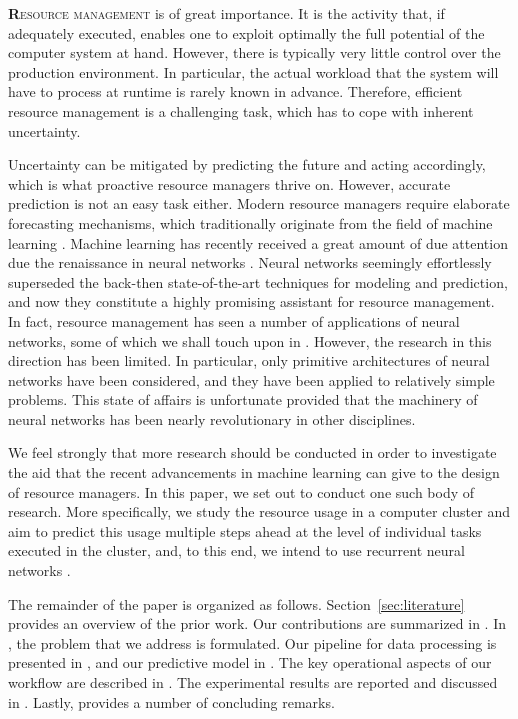 \lettrine[findent=0.2em, nindent=0em]{\textbf{R}}{esource management} is of
great importance. It is the activity that, if adequately executed, enables one
to exploit optimally the full potential of the computer system at hand. However,
there is typically very little control over the production environment. In
particular, the actual workload that the system will have to process at runtime
is rarely known in advance. Therefore, efficient resource management is a
challenging task, which has to cope with inherent uncertainty.

Uncertainty can be mitigated by predicting the future and acting accordingly,
which is what proactive resource managers thrive on. However, accurate
prediction is not an easy task either. Modern resource managers require
elaborate forecasting mechanisms, which traditionally originate from the field
of machine learning \cite{hastie2009}. Machine learning has recently received a
great amount of due attention due the renaissance in neural networks
\cite{goodfellow2016}. Neural networks seemingly effortlessly superseded the
back-then state-of-the-art techniques for modeling and prediction, and now they
constitute a highly promising assistant for resource management. In fact,
resource management has seen a number of applications of neural networks, some
of which we shall touch upon in . However, the research in this
direction has been limited. In particular, only primitive architectures of
neural networks have been considered, and they have been applied to relatively
simple problems. This state of affairs is unfortunate provided that the
machinery of neural networks has been nearly revolutionary in other disciplines.

We feel strongly that more research should be conducted in order to investigate
the aid that the recent advancements in machine learning can give to the design
of resource managers. In this paper, we set out to conduct one such body of
research. More specifically, we study the resource usage in a computer cluster
and aim to predict this usage multiple steps ahead at the level of individual
tasks executed in the cluster, and, to this end, we intend to use recurrent
neural networks \cite{goodfellow2016}.

The remainder of the paper is organized as follows. Section~\ref{sec:literature}
provides an overview of the prior work. Our contributions are summarized in
. In , the problem that we address is
formulated. Our pipeline for data processing is presented in , and
our predictive model in . The key operational aspects of our
workflow are described in . The experimental results are
reported and discussed in . Lastly,  provides a
number of concluding remarks.
